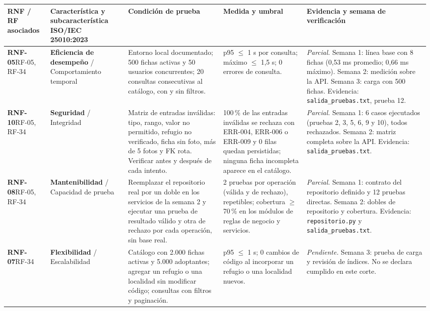 \documentclass[11pt,a4paper]{article}
\newcommand{\code}[1]{\texttt{#1}}
\newcommand{\thead}[1]{\textbf{#1}}
\begin{document}
\vspace{1mm}
{\footnotesize
\begin{tabularx}{\linewidth}{@{}V{0.55}V{1.0}V{1.3}V{1.05}V{1.1}@{}}
\toprule

\thead{RNF / RF asociados} & \thead{Característica y subcaracterística ISO/IEC 25010:2023} & \thead{Condición de prueba} & \thead{Medida y umbral} & \thead{Evidencia y semana de verificación} \\ \midrule

\textbf{RNF-05}\newline RF-05, RF-34 &
\textbf{Eficiencia de desempeño} / Comportamiento temporal &
Entorno local documentado; 500 fichas activas y 50 usuarios concurrentes; 20 consultas
consecutivas al catálogo, con y sin filtros. &
p95 $\leq$ 1 s por consulta; máximo $\leq$ 1,5 s; 0 errores de consulta. &
\textit{Parcial.} Semana 1: línea base con 8 fichas (0,53 ms promedio;
0,66 ms máximo). Semana 2: medición sobre la API. Semana 3: carga con 500 fichas.
Evidencia: \code{salida\_pruebas.txt}, prueba 12. \\

\textbf{RNF-10}\newline RF-05, RF-34 &
\textbf{Seguridad} / Integridad &
Matriz de entradas inválidas: tipo, rango, valor no permitido, refugio no verificado, ficha
sin foto, más de 5 fotos y FK rota. Verificar antes y después de cada intento. &
100\,\% de las entradas inválidas se rechaza con ERR-004, ERR-006 o ERR-009 y
0 filas quedan persistidas; ninguna ficha incompleta aparece en el catálogo. &
\textit{Parcial.} Semana 1: 6 casos ejecutados (pruebas 2, 3, 5, 6, 9 y
10), todos rechazados. Semana 2: matriz completa sobre la API. Evidencia:
\code{salida\_pruebas.txt}. \\

\textbf{RNF-08}\newline RF-05, RF-34 &
\textbf{Mantenibilidad} / Capacidad de prueba &
Reemplazar el repositorio real por un doble en los servicios de la semana 2 y ejecutar una
prueba de resultado válido y otra de rechazo por cada operación, sin base real. &
2 pruebas por operación (válida y de rechazo), repetibles; cobertura $\geq$ 70\,\% en los módulos
de reglas de negocio y servicios. &
\textit{Parcial.} Semana 1: contrato del repositorio definido y 12
pruebas directas. Semana 2: dobles de repositorio y cobertura. Evidencia:
\code{repositorio.py} y \code{salida\_pruebas.txt}. \\

\textbf{RNF-07}\newline RF-34 &
\textbf{Flexibilidad} / Escalabilidad &
Catálogo con 2.000 fichas activas y 5.000 adoptantes; agregar un refugio o una localidad
sin modificar código; consultas con filtros y paginación. &
p95 $\leq$ 1 s; 0 cambios de código al incorporar un refugio o una localidad nuevos. &
\textit{Pendiente.} Semana 3: prueba de carga y revisión de índices.
No se declara cumplido en este corte. \\


\end{tabularx}}
\end{document}
